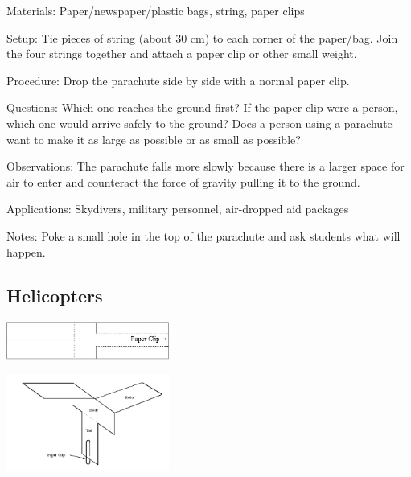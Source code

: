 \begin{multicols}{2}
\begin{description*}
\item[Materials:]{Paper/newspaper/plastic bags, string, paper clips}
\item[Setup:]{Tie pieces of string (about 30 cm) to each corner of the paper/bag. Join the four strings together and attach a paper clip or other small weight.}
\item[Procedure:]{Drop the parachute side by side with a normal paper clip.}
\item[Questions:]{Which one reaches the ground first? If the paper clip were a person, which one would arrive safely to the ground? Does a person using a parachute want to make it as large as possible or as small as possible?}
\item[Observations:]{The parachute falls more slowly because there is a larger space for air to enter and counteract the force of gravity pulling it to the ground.}
\item[Applications:]{Skydivers, military personnel, air-dropped aid packages}
\item[Notes:]{Poke a small hole in the top of the parachute and ask students what will happen.}
\end{description*}

\subsection{Helicopters}

\begin{center}
\includegraphics[width=0.4\textwidth]{./img/helicopter-1.png}
\end{center}

\begin{center}
\includegraphics[width=0.4\textwidth]{./img/helicopter-2.png}
\end{center}


\end{multicols}

